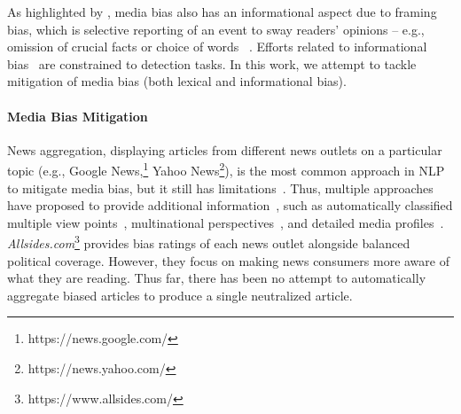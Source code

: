 \documentclass[11pt,a4paper]{article}
\begin{document}
As highlighted by \citeauthor{fan2019plain}, media bias also has an informational aspect due to framing bias, which is selective reporting of an event to sway readers' opinions -- e.g., omission of crucial facts or choice of words ~\cite{entman1993framing, entman2007framing, gentzkow2006media}. 
Efforts related to informational bias~\cite{park2011contrasting,fan2019plain} are constrained to detection tasks. In this work, we attempt to tackle mitigation of media bias (both lexical and informational bias).


\paragraph{Media Bias Mitigation}
News aggregation, displaying articles from different news outlets on a particular topic (e.g., Google News,\footnote{https://news.google.com/} Yahoo News\footnote{https://news.yahoo.com/}), is the most common approach in NLP to mitigate media bias, but it still has limitations~\cite{hamborg2019automated}.
Thus, multiple approaches have proposed to provide additional information~\cite{laban2017newslens}, such as automatically classified multiple view points~\cite{park2009newscube}, multinational perspectives~\cite{hamborg2017matrix}, and detailed media profiles~\cite{zhang2019tanbih}. \textit{Allsides.com}\footnote{https://www.allsides.com/} provides bias ratings of each news outlet alongside balanced political coverage. However, they focus on making news consumers more aware of what they are reading. Thus far, there has been no attempt to automatically aggregate biased articles to produce a single neutralized article.
\end{document}
